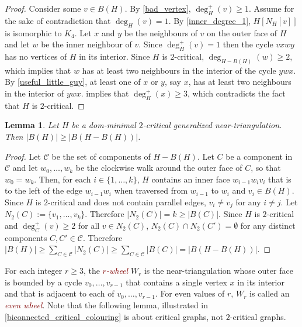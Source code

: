 \documentclass{article}
\newtheorem{lem}{Lemma}
\newcommand{\defin}[1]{\emph{\textcolor{Maroon}{#1}}}
\theoremstyle{definition}
\begin{document}
\begin{proof}
  Consider some $v\in B(H)$. By \cref{bad_vertex}, $\deg^+_H(v)\ge 1$. Assume for the sake of contradiction that $\deg_H(v)=1$. By \cref{inner_degree_1}, $H[N_H[v]]$ is isomorphic to $K_4$. Let $x$ and $y$ be the neighbours of $v$ on the outer face of $H$ and let $w$ be the inner neighbour of $v$. Since $\deg^+_H(v)=1$ then the cycle $vxwy$ has no vertices of $H$ in its interior.  Since $H$ is $2$-critical, $\deg_{H-B(H)}(w)\ge 2$, which implies that $w$ has at least two neighbours in the interior of the cycle $ywx$.  By \cref{useful_little_guy}, at least one of $x$ or $y$, say $x$, has at least two neighbours in the interior of $ywx$.   implies that $\deg^+_H(x)\ge 3$, which contradicts the fact that $H$ is $2$-critical.
\end{proof}


\begin{lem}\label{two_critical_boundary_size}
  Let $H$ be a dom-minimal $2$-critical generalized near-triangulation.  Then $|B(H)|\ge |B(H-B(H))|$.
\end{lem}

\begin{proof}
  Let $\mathcal{C}$ be the set of components of $H-B(H)$.
  Let $C$ be a component in $\mathcal{C}$ and let $w_0,\ldots,w_k$ be the clockwise walk around the outer face of $C$, so that $w_0=w_k$.  Then, for each $i\in\{1,\ldots,k\}$, $H$ contains an inner face $w_{i-1}w_iv_i$ that is to the left of the edge $w_{i-1}w_i$ when traversed from $w_{i-1}$ to $w_i$ and $v_i\in B(H)$.  Since $H$ is $2$-critical and does not contain parallel edges, $v_i\neq v_j$ for any $i\neq j$. Let $N_2(C):=\{v_1,\ldots,v_k\}$.  Therefore $|N_2(C)|= k\ge |B(C)|$. Since $H$ is $2$-critical and $\deg^+_C(v)\ge 2$ for all $v\in N_2(C)$, $N_2(C)\cap N_2(C')=\emptyset$ for any distinct components $C,C'\in\mathcal{C}$.  Therefore $|B(H)|\ge \sum_{C\in\mathcal{C}} |N_2(C)|\ge \sum_{C\in\mathcal{C}} |B(C)|=|B(H-B(H))|$.
\end{proof}

For each integer $r\ge 3$, the \defin{$r$-wheel} $W_r$ is the near-triangulation whose outer face is bounded by a cycle $v_0,\ldots,v_{r-1}$ that contains a single vertex $x$ in its interior and that is adjacent to each of $v_0,\ldots,v_{r-1}$.  For even values of $r$, $W_r$ is called an \defin{even wheel}. Note that the following lemma, illustrated in \cref{biconnected_critical_colouring} is about critical graphs, not $2$-critical graphs.
\end{document}
